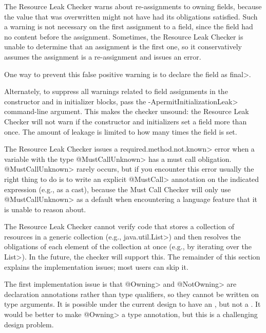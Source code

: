 

The Resource Leak Checker warns about re-assignments to owning fields,
because the value that was overwritten might not have had its obligations
satisfied.  Such a warning is not necessary on the first assignment to a
field, since the field had no content before the assignment.  Sometimes,
the Resource Leak Checker is unable to determine that an assignment is the
first one, so it conservatively assumes the assignment is a re-assignment
and issues an error.

One way to prevent this false positive warning is to declare the field as \<final>.

Alternately, to suppress all warnings related to field assignments in the
constructor and in initializer blocks, pass the
\<-ApermitInitializationLeak> command-line argument.  This makes the
checker unsound:  the Resource Leak Checker will not warn if the constructor
and initializers set a field more than once.  The amount of leakage is
limited to how many times the field is set.


The Resource Leak Checker issues a \<required.method.not.known> error
when a variable with the type \<@MustCallUnknown> has a must call obligation.
\<@MustCallUnknown> rarely occurs, but if you encounter this error usually
the right thing to do is to write an explicit \<@MustCall> annotation
on the indicated expression (e.g., as a cast), because the Must Call Checker
will only use \<@MustCallUnknown> as a default when encountering a language
feature that it is unable to reason about.


The Resource Leak Checker cannot verify code that stores a collection of
resources in a generic collection (e.g., \<java.util.List>) and then
resolves the obligations of each element of the collection at once (e.g.,
by iterating over the \<List>).  In the future, the checker will support
this.  The remainder of this section explains the implementation issues;
most users can skip it.

The first implementation issue is that \<@Owning> and \<@NotOwning> are
declaration annotations rather than type qualifiers, so they cannot be
written on type arguments. It is possible under the current design to have
an , but not a .
It would be better to make \<@Owning> a type annotation, but this is a
challenging design problem.

